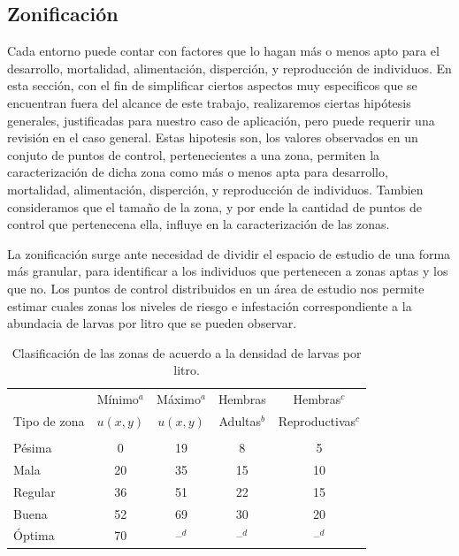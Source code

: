 \subsection{Zonificación}
\label{subsec:cap4-zonificacion}
Cada entorno puede contar con factores que lo hagan más o menos apto para el desarrollo,
mortalidad, alimentación, disperción, y reproducción de individuos. En esta sección, con el fin de
simplificar ciertos aspectos muy especificos que se encuentran fuera del alcance de este trabajo,
realizaremos ciertas hipótesis generales, justificadas para nuestro caso de aplicación, pero puede
requerir una revisión en el caso general. Estas hipotesis son, los valores observados en un
conjuto de puntos de control, pertenecientes a una zona, permiten la caracterización de dicha zona como más o menos apta para desarrollo, mortalidad, alimentación, disperción, y reproducción de
individuos. Tambien consideramos que el tamaño de la zona, y por ende la cantidad de puntos de
control que pertenecena ella, influye en la caracterización de las zonas.

La zonificación surge ante necesidad de dividir el espacio de estudio de una forma más granular,
para identificar a los individuos que pertenecen a zonas aptas y los que no. Los puntos de control
distribuidos en un área de estudio nos permite estimar cuales zonas los niveles de riesgo e
infestación correspondiente a la abundacia de larvas por litro que se pueden observar.

\begin{table} [H]
    \begin{minipage}{\textwidth}
\begin{center}
    \caption{\label{tab:cap4-puntaje-zona} Clasificación de las zonas de acuerdo a la densidad de larvas por litro.}
    \begin{tabular}{p{3cm} c c c c}
        \\
                     & Mínimo$^a$ & Máximo$^a$ & Hembras     & Hembras$^c$ \\
        Tipo de zona & $u(x,y)$   & $u(x,y)$   & Adultas$^b$ & Reproductivas$^c$ \\
        \hline
        \hline\\
        Pésima  & 0  & 19 & 8  & 5 \\
        Mala    & 20 & 35 & 15 & 10\\
        Regular & 36 & 51 & 22 & 15\\
        Buena   & 52 & 69 & 30 & 20\\
        Óptima  & 70 & --$^d$ & --$^d$ & --$^d$\\
    \end{tabular}
\end{center}
    \end{minipage}
\end{table}

